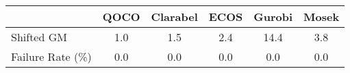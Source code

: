 \begin{tabular}{lccccc}
  \hline
   & \textbf{QOCO} & \textbf{Clarabel} & \textbf{ECOS} & \textbf{Gurobi} & \textbf{Mosek} \\ \hline
  Shifted GM & 1.0 & 1.5 & 2.4 & 14.4 & 3.8 \\ 
  Failure Rate (\%) & 0.0 & 0.0 & 0.0 & 0.0 & 0.0 \\ \hline 
\end{tabular}
